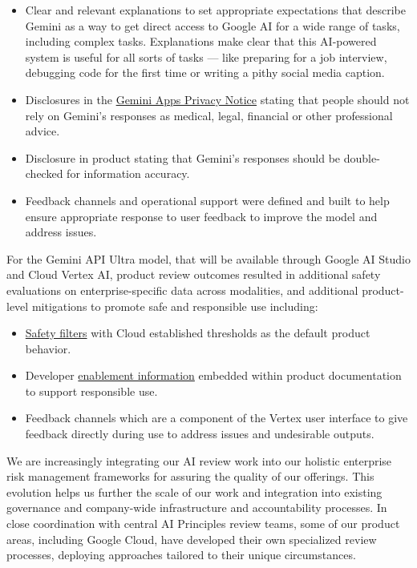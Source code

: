 \begin{itemize}
\item Clear and relevant explanations to set appropriate expectations that describe Gemini as a way to get direct access to Google AI for a wide range of tasks, including complex tasks. Explanations make clear that this AI-powered system is useful for all sorts of tasks — like preparing for a job interview, debugging code for the first time or writing a pithy social media caption. 
\item Disclosures in the \href{https://support.google.com/gemini?p=privacy_notice}{Gemini Apps Privacy Notice} stating that people should not rely on Gemini’s responses as medical, legal, financial or other professional advice.
\item Disclosure in product stating that Gemini’s responses should be double-checked for information accuracy. 
\item Feedback channels and operational support were defined and built to help ensure appropriate response to user feedback to improve the model and address issues.
\end{itemize}

For the Gemini API Ultra model, that will be available through Google AI Studio and Cloud Vertex AI, product review outcomes resulted in additional safety evaluations on enterprise-specific data across modalities, and additional product-level mitigations to promote safe and responsible use including:

\begin{itemize}
\item \href{https://cloud.google.com/vertex-ai/docs/generative-ai/multimodal/configure-safety-attributes#safety_attribute_definitions}{Safety filters} with Cloud established thresholds as the default product behavior.
\item Developer \href{https://cloud.google.com/vertex-ai/docs/generative-ai/learn/responsible-ai}{enablement information} embedded within product documentation to support responsible use.
\item Feedback channels which are a component of the Vertex user interface to give feedback directly during use to address issues and undesirable outputs. 
\end{itemize}

We are increasingly integrating our AI review work into our holistic enterprise risk management frameworks for assuring the quality of our offerings. This evolution helps us further the scale of our work and integration into existing governance and company-wide infrastructure and accountability processes. In close coordination with central AI Principles review teams, some of our product areas, including Google Cloud, have developed their own specialized review processes, deploying approaches tailored to their unique circumstances. 

